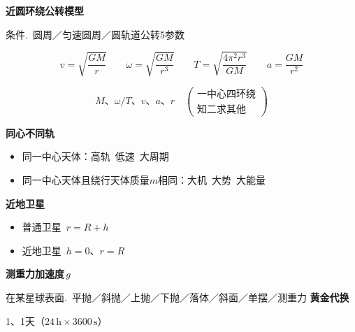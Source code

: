 \textbf{近圆环绕公转模型}

条件.\ 圆周／匀速圆周／圆轨道\hfill 公转5参数

\[
v=\sqrt{\frac{GM}{r}}\qquad
\omega=\sqrt{\frac{GM}{r^{3}}}\qquad
T=\sqrt{\frac{4\pi^{2}r^{3}}{GM}}\qquad
a=\frac{GM}{r^{2}}
\]

\[
M\text{、}\omega/T\text{、}v\text{、}a\text{、}r\quad
\left(\begin{array}{l}\text{一中心四环绕}\\ \text{知二求其他}\end{array}\right)
\]

\textbf{同心不同轨}
\begin{itemize}
\item 同一中心天体：高轨\ 低速\ 大周期
\item 同一中心天体且绕行天体质量$m$相同：大机\ 大势\ 大能量
\end{itemize}

\textbf{近地卫星}
\begin{itemize}
\item 普通卫星\ $r=R+h$
\item 近地卫星\ $h=0$、$r=R$
\end{itemize}
\textbf{测重力加速度}$\,g$

在某星球表面.\ 平抛／斜抛／上抛／下抛／落体／斜面／单摆／测重力
\textbf{黄金代换}

1、\quad 1天（$24\,\mathrm{h}\times3600\,\mathrm{s}$）


